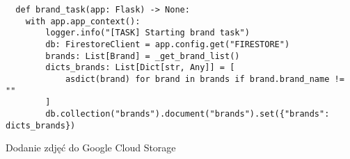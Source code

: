 \begin{code}[H]
  \begin{verbatim}
  def brand_task(app: Flask) -> None:
    with app.app_context():
        logger.info("[TASK] Starting brand task")
        db: FirestoreClient = app.config.get("FIRESTORE")
        brands: List[Brand] = _get_brand_list()
        dicts_brands: List[Dict[str, Any]] = [
            asdict(brand) for brand in brands if brand.brand_name != ""
        ]
        db.collection("brands").document("brands").set({"brands": dicts_brands})
  \end{verbatim}
  \caption{Dodanie zdjęć do Google Cloud Storage}
  \label{brand_task}
\end{code}
